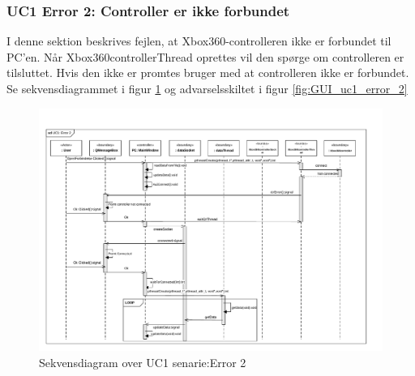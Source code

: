 \subsubsection{UC1 Error 2: Controller er ikke forbundet}
I denne sektion beskrives fejlen, at Xbox360-controlleren ikke er forbundet til PC'en. Når Xbox360controllerThread oprettes vil den spørge om controlleren er tilsluttet. Hvis den ikke er promtes bruger med at controlleren ikke er forbundet. Se sekvensdiagrammet i figur \ref{fig:cd_uc1_error_2} og advarselsskiltet i figur \ref{fig:GUI_uc1_error_2}

\begin{figure}[H]
\centering
\includegraphics[width=\textwidth* 1,height=\textwidth* 1 ]{../fig/diagrammer/pc/sd_uc1_Error_2.pdf}
\caption{Sekvensdiagram over UC1 senarie:Error 2}
\label{fig:cd_uc1_error_2}
\end{figure}

